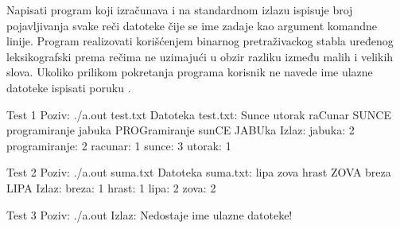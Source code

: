 \begin{Exercise}[label=702]
Napisati program koji izračunava i na standardnom izlazu ispisuje broj pojavljivanja svake reči datoteke čije se ime zadaje kao argument komandne linije. Program realizovati korišćenjem binarnog pretraživackog stabla uređenog leksikografski prema rečima ne uzimajući u obzir razliku između malih i velikih slova. Ukoliko prilikom pokretanja programa korisnik ne navede ime ulazne datoteke ispisati poruku .


\begin{miditest}
\begin{test}{Test 1}
Poziv: ./a.out test.txt
Datoteka test.txt:
	Sunce utorak raCunar SUNCE programiranje jabuka PROGramiranje sunCE JABUka
Izlaz:
	jabuka: 2
	programiranje: 2
	racunar: 1
	sunce: 3
	utorak: 1
\end{test}
\end{miditest}

\begin{miditest}
\begin{test}{Test 2}
Poziv: ./a.out suma.txt
Datoteka suma.txt:
	lipa zova hrast ZOVA breza LIPA
Izlaz:
	breza: 1
	hrast: 1
	lipa: 2
	zova: 2
\end{test}
\end{miditest}

\begin{miditest}
\begin{test}{Test 3}
Poziv: ./a.out 
Izlaz:
	Nedostaje ime ulazne datoteke!
\end{test}
\end{miditest}

\end{Exercise}


\begin{Answer}[ref=702]
\end{Answer}



